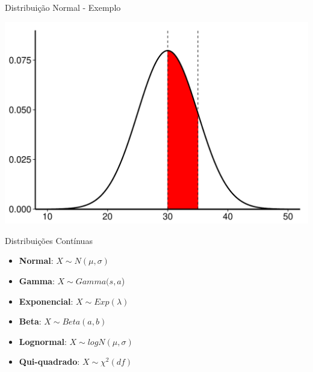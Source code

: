 \documentclass{beamer}\usepackage[]{graphicx}\usepackage[]{color}
\makeatletter
\def\maxwidth{ %
  \ifdim\Gin@nat@width>\linewidth
    \linewidth
  \else
    \Gin@nat@width
  \fi
}
\newenvironment{knitrout}{}{} %
\renewenvironment{knitrout}{\setlength{\topsep}{0mm}}{}
\makeatother
\begin{document}
\begin{frame}[fragile]{Distribuição Normal - Exemplo}

\begin{knitrout}
\color{fgcolor}
\includegraphics[width=\maxwidth,height=0.7\textheight]{figure/cumnormplot3-1} 

\end{knitrout}

\end{frame} 


\begin{frame}{Distribuições Contínuas}

\begin{small}
\begin{itemize}
  \item \textbf{Normal}: $X \sim N(\mu,\sigma)$
  \vfill
  \item \textbf{Gamma}: $X \sim Gamma(s,a$)
  \vfill
  \item \textbf{Exponencial}: $X \sim Exp(\lambda)$
  \vfill
  \item \textbf{Beta}: $X \sim Beta(a,b)$
  \vfill
  \item \textbf{Lognormal}: $X \sim logN(\mu,\sigma)$
  \vfill
  \item \textbf{Qui-quadrado}: $X \sim \chi^2(df)$
\end{itemize}
\end{small}

\end{frame} 
\end{document}
